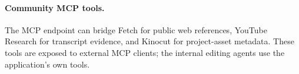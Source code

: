 \paragraph{Community MCP tools.}
The MCP endpoint can bridge Fetch for public web references, YouTube Research for transcript evidence, and Kinocut for project-asset metadata. These tools are exposed to external MCP clients; the internal editing agents use the application's own tools.

\FloatBarrier

